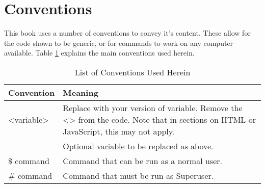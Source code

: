 \documentclass[twoside,a6paper,11pt]{report}
\begin{document}
	\section*{Conventions}
		This book uses a number of conventions to convey it's content. 
		These allow for the code shown to be generic, or for commands to work on any computer available. 
		Table \ref{tab:BookConventions} explains the main conventions used herein. 
		\begin{table}[htb]
			\centering
			\begin{tabular}{|l|p{7cm}|}
				\hline
				\textbf{Convention} & \textbf{Meaning} \\ \hline
				<variable> & Replace with your version of variable. 
								Remove the <> from the code. 
								Note that in sections on HTML or JavaScript, this may not apply. \\ \hline
				[variable] & Optional variable to be replaced as above. \\ \hline
				\$ command & Command that can be run as a normal user. \\ \hline
				\# command & Command that must be run as Superuser. \\ \hline
			\end{tabular}
			\caption{List of Conventions Used Herein}
			\label{tab:BookConventions}
		\end{table}
\mainmatter















\appendix
	\label{ch:Appendix}
	
	
	\printindex
\end{document}
